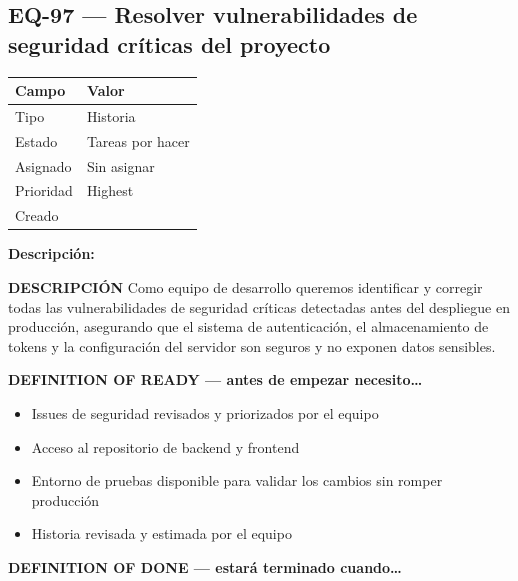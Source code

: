 \documentclass[
  spanish,
  11pt,
]{report}
\newcounter{none} %
\providecommand{\tightlist}{%
  \setlength{\itemsep}{0pt}\setlength{\parskip}{0pt}}
\begin{document}
\subsection{EQ-97 --- Resolver vulnerabilidades de seguridad críticas
del
proyecto}\label{eq-97-resolver-vulnerabilidades-de-seguridad-cruxedticas-del-proyecto}

{\def\LTcaptype{none} %
\begin{longtable}[]{@{}ll@{}}
\toprule\noalign{}
Campo & Valor \\
\midrule\noalign{}
\endhead
\bottomrule\noalign{}
\endlastfoot
Tipo & Historia \\
Estado & Tareas por hacer \\
Asignado & Sin asignar \\
Prioridad & Highest \\
Creado & \\
\end{longtable}
}

\textbf{Descripción:}

\textbf{DESCRIPCIÓN} Como equipo de desarrollo queremos identificar y
corregir todas las vulnerabilidades de seguridad críticas detectadas
antes del despliegue en producción, asegurando que el sistema de
autenticación, el almacenamiento de tokens y la configuración del
servidor son seguros y no exponen datos sensibles.

\textbf{DEFINITION OF READY --- antes de empezar necesito\ldots{}}

\begin{itemize}
\tightlist
\item
  Issues de seguridad revisados y priorizados por el equipo
\item
  Acceso al repositorio de backend y frontend
\item
  Entorno de pruebas disponible para validar los cambios sin romper
  producción
\item
  Historia revisada y estimada por el equipo
\end{itemize}

\textbf{DEFINITION OF DONE --- estará terminado cuando\ldots{}}
\end{document}
